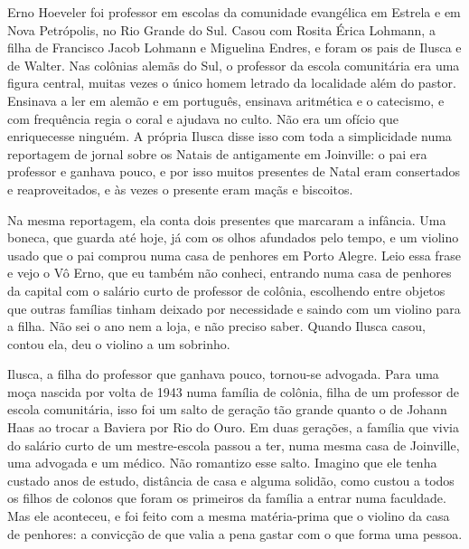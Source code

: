 \documentclass[
  brazilian,
  11pt,
  openany]{book}
\begin{document}
Erno Hoeveler foi professor em escolas da comunidade evangélica em
Estrela e em Nova Petrópolis, no Rio Grande do Sul. Casou com Rosita
Érica Lohmann, a filha de Francisco Jacob Lohmann e Miguelina Endres, e
foram os pais de Ilusca e de Walter. Nas colônias alemãs do Sul, o
professor da escola comunitária era uma figura central, muitas vezes o
único homem letrado da localidade além do pastor. Ensinava a ler em
alemão e em português, ensinava aritmética e o catecismo, e com
frequência regia o coral e ajudava no culto. Não era um ofício que
enriquecesse ninguém. A própria Ilusca disse isso com toda a
simplicidade numa reportagem de jornal sobre os Natais de antigamente em
Joinville: o pai era professor e ganhava pouco, e por isso muitos
presentes de Natal eram consertados e reaproveitados, e às vezes o
presente eram maçãs e biscoitos.

Na mesma reportagem, ela conta dois presentes que marcaram a infância.
Uma boneca, que guarda até hoje, já com os olhos afundados pelo tempo, e
um violino usado que o pai comprou numa casa de penhores em Porto
Alegre. Leio essa frase e vejo o Vô Erno, que eu também não conheci,
entrando numa casa de penhores da capital com o salário curto de
professor de colônia, escolhendo entre objetos que outras famílias
tinham deixado por necessidade e saindo com um violino para a filha. Não
sei o ano nem a loja, e não preciso saber. Quando Ilusca casou, contou
ela, deu o violino a um sobrinho.

Ilusca, a filha do professor que ganhava pouco, tornou-se advogada. Para
uma moça nascida por volta de 1943 numa família de colônia, filha de um
professor de escola comunitária, isso foi um salto de geração tão grande
quanto o de Johann Haas ao trocar a Baviera por Rio do Ouro. Em duas
gerações, a família que vivia do salário curto de um mestre-escola
passou a ter, numa mesma casa de Joinville, uma advogada e um médico.
Não romantizo esse salto. Imagino que ele tenha custado anos de estudo,
distância de casa e alguma solidão, como custou a todos os filhos de
colonos que foram os primeiros da família a entrar numa faculdade. Mas
ele aconteceu, e foi feito com a mesma matéria-prima que o violino da
casa de penhores: a convicção de que valia a pena gastar com o que forma
uma pessoa.
\end{document}
